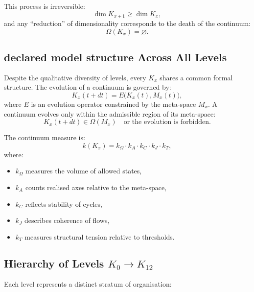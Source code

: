 This process is irreversible:
\[
\dim K_{x+1} \ge \dim K_x,
\]
and any ``reduction'' of dimensionality corresponds to the death of the
continuum:
\[
\Omega(K_x) = \varnothing.
\]


\subsection{declared model structure Across All Levels}

Despite the qualitative diversity of levels, every $K_x$ shares a common
formal structure.
The evolution of a continuum is governed by:
\[
K_x(t + dt) = E\bigl(K_x(t), M_x(t)\bigr),
\]
where $E$ is an evolution operator constrained by the meta-space
$M_x$.
A continuum evolves only within the admissible region of its
meta-space:
\[
K_x(t+dt) \in \Omega(M_x)
\quad\text{or the evolution is forbidden}.
\]

The continuum measure is:
\[
k(K_x) =
k_{\Omega} \cdot k_{A} \cdot k_{C} \cdot k_{J} \cdot k_{T},
\]
where:
\begin{itemize}
    \item $k_{\Omega}$ measures the volume of allowed states,
    \item $k_{A}$ counts realised axes relative to the meta-space,
    \item $k_{C}$ reflects stability of cycles,
    \item $k_{J}$ describes coherence of flows,
    \item $k_{T}$ measures structural tension relative to thresholds.
\end{itemize}


\subsection{Hierarchy of Levels $K_0 \to K_{12}$}

Each level represents a distinct stratum of organisation:

